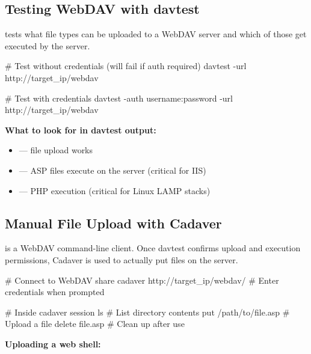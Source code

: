 \subsection{Testing WebDAV with davtest}

 tests what file types can be uploaded to a WebDAV server and
which of those get executed by the server.



\begin{termbox}
# Test without credentials (will fail if auth required)
davtest -url http://target_ip/webdav

# Test with credentials
davtest -auth username:password -url http://target_ip/webdav
\end{termbox}

\begin{notebox}

\textbf{What to look for in davtest output:}
\begin{itemize}
  \item {} --- file upload works
  \item {} --- ASP files execute on the server (critical for IIS)
  \item {} --- PHP execution (critical for Linux LAMP stacks)
\end{itemize}


\subsection{Manual File Upload with Cadaver}

 is a WebDAV command-line client. Once davtest confirms upload and
execution permissions, Cadaver is used to actually put files on the server.

\begin{termbox}
# Connect to WebDAV share
cadaver http://target_ip/webdav/
# Enter credentials when prompted

# Inside cadaver session
ls                              # List directory contents
put /path/to/file.asp           # Upload a file
delete file.asp                 # Clean up after use
\end{termbox}

\textbf{Uploading a web shell:}


\end{notebox}
